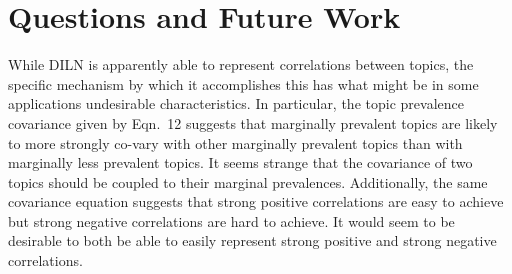\documentclass[twoside]{article}
\begin{document}



\section{Questions and Future Work}

While DILN is apparently able to represent correlations between topics, the specific mechanism by which it accomplishes this has what might be in some applications undesirable characteristics.  In particular, the topic prevalence covariance given by Eqn.~12 suggests that marginally prevalent topics are likely to more strongly co-vary with other marginally prevalent topics than with marginally less prevalent topics.  It seems strange that the covariance of two topics should be coupled to their marginal prevalences.  Additionally, the same covariance equation suggests that strong positive correlations are easy to achieve but strong negative correlations are hard to achieve.  It would seem to be desirable to both be able to easily represent strong positive and strong negative correlations.   
\end{document}
